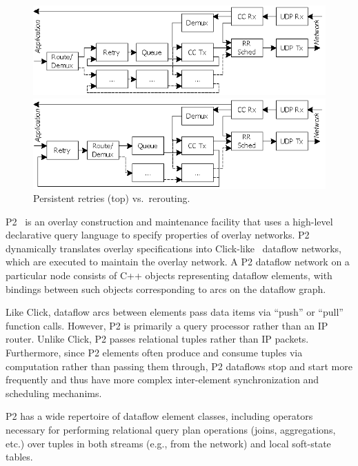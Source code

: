 \documentclass[10pt,twocolumn]{article}
\newlength{\figurewidth}
\renewcommand{\subsection}[1]{\vspace{10pt}\noindent\textbf{#1:}\vspace{5pt}}
\begin{document}

\begin{figure}
\centerline{\includegraphics[width=\figurewidth]{ManyRetries}}
\centerline{\includegraphics[width=\figurewidth]{SingleRetry}}
\caption{Persistent retries (top) vs.\ rerouting.}
\label{fig:RetryOrdering}
\end{figure}

P2~\cite{p2:sosp} is an overlay construction and
maintenance facility that uses a high-level declarative query language
to specify properties of overlay networks.   P2 dynamically translates
overlay specifications into Click-like~\cite{click-tocs} dataflow
networks, which are executed to maintain the overlay network.  A P2
dataflow network on a particular node consists of C++ objects
representing dataflow elements, with bindings between such objects
corresponding to arcs on the dataflow graph.  

Like Click, dataflow arcs between
elements pass data items via ``push'' or ``pull'' function calls.
However, P2 is primarily a query processor rather than an IP router. 
Unlike Click, P2 passes relational tuples rather than IP packets.
Furthermore, since P2 elements often produce and consume tuples via
computation rather than passing them through, P2 dataflows stop and
start more frequently and thus have more complex inter-element
synchronization and scheduling mechanims. 

P2 has a wide repertoire of dataflow element classes, including
operators necessary for performing relational query plan operations
(joins, aggregations, etc.) over tuples in both streams (e.g., from
the network) and local soft-state tables. 
\end{document}
